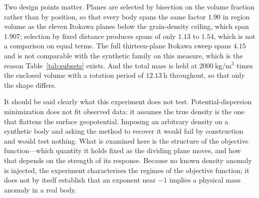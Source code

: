 Two design points matter. Planes are selected by bisection on the volume
fraction rather than by position, so that every body spans the same factor
$1.90$ in region volume as the eleven Itokawa planes below the grain-density ceiling, which span
$1.907$; selection by fixed distance produces spans of only $1.13$ to
$1.54$, which is not a comparison on equal terms. The full thirteen-plane
Itokawa sweep spans $4.15$ and is not comparable with the synthetic family
on this measure, which is the reason Table~\ref{tab:subsets} exists. And the
total mass is held at $\SI{2000}{\kilo\gram\per\cubic\metre}$ times the
enclosed volume with a rotation period of $\SI{12.13}{\hour}$ throughout, so
that only the shape differs.

It should be said clearly what this experiment does not test.
Potential-dispersion minimization does not fit observed data: it assumes the
true density is the one that flattens the surface geopotential. Imposing an
arbitrary density on a synthetic body and asking the method to recover it
would fail by construction and would test nothing. What is examined here is
the structure of the objective function---which quantity it holds fixed as
the dividing plane moves, and how that depends on the strength of its
response. Because no known density anomaly is injected, the experiment
characterises the regimes of the objective function; it does not by itself
establish that an exponent near $-1$ implies a physical mass anomaly in a
real body.

